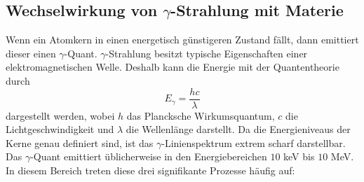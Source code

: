 \subsection{Wechselwirkung von $\gamma$-Strahlung mit Materie}
Wenn ein Atomkern in einen energetisch günstigeren Zustand fällt, dann emittiert dieser einen $\gamma$-Quant. $\gamma$-Strahlung besitzt typische Eigenschaften einer elektromagnetischen Welle. Deshalb kann die Energie mit der Quantentheorie durch
\begin{equation*}
  E_{\gamma}=\frac{hc}{\lambda}
\end{equation*}
dargestellt werden, wobei $h$ das Plancksche Wirkumsquantum, $c$ die Lichtgeschwindigkeit und $\lambda$ die Wellenlänge darstellt. Da die Energieniveaus der Kerne genau definiert sind, ist das $\gamma$-Linienspektrum extrem scharf darstellbar. \\
Das $\gamma$-Quant emittiert üblicherweise in den Energiebereichen $10$ keV bis $10$ MeV. In diesem Bereich treten diese drei signifikante Prozesse häufig auf:
